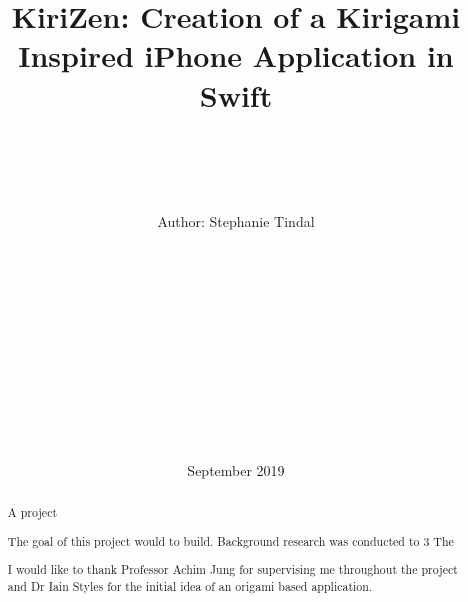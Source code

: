 \documentclass[11pt]{article}
\begin{document}
\begin{titlepage}
    \title{\vspace{40pt}\Huge KiriZen: Creation of a Kirigami Inspired iPhone Application in Swift}

    \author{ \\\hline \\\\\\ \Large \vspace{5pt} Author: Stephanie Tindal \\\Large \vspace{5pt}{Student ID: 1936508}\\\Large \vspace{50pt}{Supervisor: Achim Jung} \\ \hline\\\\\\  \vspace{5pt}{MSc Computer Science} \\ \vspace{5pt}{School of Computer Science, University of Birmingham}\\\\\\ \hline\\\\}

    \date{September 2019 \vspace{20pt}}
    \maketitle

\end{titlepage}
    \tableofcontents


\newpage

\begin{abstract}
    A project 
    
    The goal of this project would to build.
    Background research was conducted to 
    3
    The

\end{abstract}

\vspace{50pt}
\renewcommand{\abstractname}{Acknowledgements}
\begin{abstract}
    I would like to thank Professor Achim Jung for supervising me throughout the project and Dr Iain Styles for the initial idea of an origami based application. 
\end{abstract}
\end{document}
